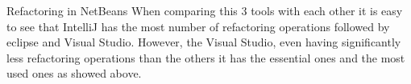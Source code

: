 Refactoring in NetBeans 
When comparing this 3 tools with each other it is easy to see that IntelliJ has the most number of refactoring operations followed by eclipse and Visual Studio. However, the Visual Studio, even having significantly less refactoring operations than the others it has the essential ones and the most used ones as showed above.


